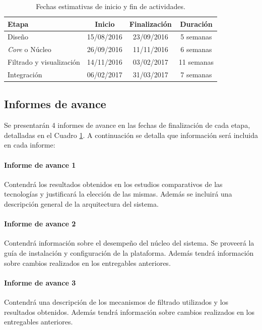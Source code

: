 \begin{table}[bp]
	\begin{center}	
		\begin{tabular}{|l|c|c|c|}
			\hline 
			Etapa & Inicio & Finalización & Duración \\ \hline
			Diseño & 15/08/2016 & 23/09/2016 & 5 semanas \\
			\textit{Core} o Núcleo & 26/09/2016 & 11/11/2016 & 6 semanas \\
			Filtrado y visualización & 14/11/2016 & 03/02/2017 & 11 semanas \\
			Integración & 06/02/2017 & 31/03/2017 & 7 semanas \\ \hline
		\end{tabular}
	\end{center}
	\caption{Fechas estimativas de inicio y fin de actividades.}
	\label{table:cronograma}
\end{table}


\subsection*{Informes de avance}


Se presentarán 4 informes de avance en las fechas de finalización de cada etapa, detalladas en el Cuadro \ref{table:cronograma}. A continuación se detalla que información será incluida en cada informe:

\paragraph{Informe de avance 1} 
Contendrá los resultados obtenidos en los estudios comparativos de las tecnologías y justificará la elección de las mismas. Además se incluirá una descripción general de la arquitectura del sistema.

\paragraph{Informe de avance 2}
Contendrá información sobre el desempeño del núcleo del sistema. Se proveerá la guía de instalación y configuración de la plataforma. Además tendrá información sobre cambios realizados en los entregables anteriores.

\paragraph{Informe de avance 3}
Contendrá una descripción de los mecanismos de filtrado utilizados y los resultados obtenidos. Además tendrá información sobre cambios realizados en los entregables anteriores.

